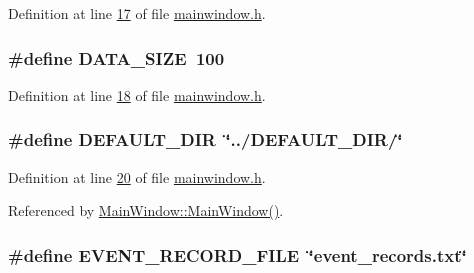 Definition at line \hyperlink{a00110_source_l00017}{17} of file \hyperlink{a00110_source}{mainwindow.\+h}.

\hypertarget{a00110_af55149bc1f05cf18af067a302e31e3f9}{
\subsubsection[{D\+A\+T\+A\+\_\+\+S\+I\+Z\+E}]{\setlength{\rightskip}{0pt plus 5cm}\#define D\+A\+T\+A\+\_\+\+S\+I\+Z\+E~100}}\label{a00110_af55149bc1f05cf18af067a302e31e3f9}


Definition at line \hyperlink{a00110_source_l00018}{18} of file \hyperlink{a00110_source}{mainwindow.\+h}.

\hypertarget{a00110_a63ec0cea9c1f0ca8a7893c2c53d2fd81}{
\subsubsection[{D\+E\+F\+A\+U\+L\+T\+\_\+\+D\+I\+R}]{\setlength{\rightskip}{0pt plus 5cm}\#define D\+E\+F\+A\+U\+L\+T\+\_\+\+D\+I\+R~\char`\"{}../D\+E\+F\+A\+U\+L\+T\+\_\+\+D\+I\+R/\char`\"{}}}\label{a00110_a63ec0cea9c1f0ca8a7893c2c53d2fd81}


Definition at line \hyperlink{a00110_source_l00020}{20} of file \hyperlink{a00110_source}{mainwindow.\+h}.



Referenced by \hyperlink{a00109_source_l00024}{Main\+Window\+::\+Main\+Window()}.

\hypertarget{a00110_a8d4ad2cd60e024f6e0f37dbac40768a1}{
\subsubsection[{E\+V\+E\+N\+T\+\_\+\+R\+E\+C\+O\+R\+D\+\_\+\+F\+I\+L\+E}]{\setlength{\rightskip}{0pt plus 5cm}\#define E\+V\+E\+N\+T\+\_\+\+R\+E\+C\+O\+R\+D\+\_\+\+F\+I\+L\+E~\char`\"{}event\+\_\+records.\+txt\char`\"{}}}\label{a00110_a8d4ad2cd60e024f6e0f37dbac40768a1}


